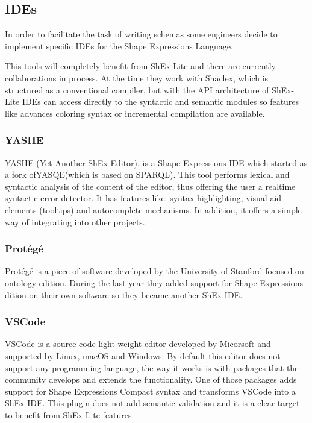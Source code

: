 \subsection{IDEs}
In order to facilitate the task of writing schemas some engineers decide to implement specific IDEs for the Shape Expressions Language.

This tools will completely benefit from ShEx-Lite and there are currently collaborations in process. At the time they work with Shaclex, which is structured as a conventional compiler, but with the API architecture of ShEx-Lite IDEs can access directly to the syntactic and semantic modules so features like advances coloring syntax or incremental compilation are available.

\subsubsection{YASHE}
YASHE (Yet Another ShEx Editor), is a Shape Expressions IDE which started as a fork ofYASQE(which is based on SPARQL). This tool performs lexical and syntactic analysis of the content of the editor, thus offering the user a realtime syntactic error detector. It has features like: syntax highlighting, visual aid elements (tooltips) and autocomplete mechanisms. In addition, it offers a simple way of integrating into other projects.

\subsubsection{Protégé}
Protégé is a piece of software developed by the University of Stanford focused on ontology edition. During the last year they added support for Shape Expressions dition on their own software so they became another ShEx IDE.

\subsubsection{VSCode}
VSCode is a source code light-weight editor developed by Micorsoft and supported by Linux, macOS and Windows. By default this editor does not support any programming language, the way it works is with packages that the community develops and extends the functionality. One of those packages adds support for Shape Expressions Compact syntax and transforms VSCode into a ShEx IDE.
This plugin does not add semantic validation and it is a clear target to benefit from ShEx-Lite features.

